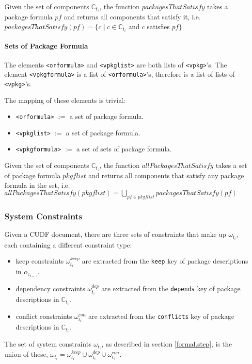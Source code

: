 \begin{defs}
Given the set of components $\mathbb{C}_{t_i}$,
the function $packagesThatSatisfy$ takes a package formula $pf$ and returns all components that satisfy it, i.e. $packagesThatSatisfy(pf) = \{c \mid c \in \mathbb{C}_{t_i}$ and $ c$ satisfies $pf\}$
\end{defs}

\paragraph{Sets of Package Formula}
The elements \texttt{<orformula>} and \texttt{<vpkglist>} are both lists of \texttt{<vpkg>}'s.
The element \texttt{<vpkgformula>} is a list of \texttt{<orformula>}'s, therefore is a list of lists of \texttt{<vpkg>}'s.

The mapping of these elements is trivial:
\begin{itemize}
  \item \texttt{<orformula>} $ := $ a set of package formula.
  \item \texttt{<vpkglist>} $ := $ a set of package formula.
  \item \texttt{<vpkgformula>} $ := $ a set of sets of package formula.
\end{itemize}

\begin{defs}
Given the set of components $\mathbb{C}_{t_i}$,
the function $allPackagesThatSatisfy$ takes a set of package formula $pkgflist$ and returns all components that satisfy any package formula in the set,
i.e. $allPackagesThatSatisfy(pkgflist) = \bigcup \limits_{pf \in pkgflist} packagesThatSatisfy(pf)$ 
\end{defs}

\subsubsection{System Constraints}
Given a CUDF document, there are three sets of constraints that make up $\omega_{t_i}$, each containing a different constraint type:
\begin{itemize}
  \item keep constraints $\omega_{t_i}^{keep}$ are extracted from the \verb+keep+ key of package descriptions in $\alpha_{t_{i-1}}$.
  \item dependency constraints $\omega_{t_i}^{dep}$ are extracted from the \verb+depends+ key of package descriptions in $\mathbb{C}_{t_i}$.
  \item conflict constraints $\omega_{t_i}^{con}$ are extracted from the \verb+conflicts+ key of package descriptions in $\mathbb{C}_{t_i}$.
\end{itemize}
The set of system constraints $\omega_{t_i}$, as described in section \ref{formal.step}, is the union of these,
$\omega_{t_i} =  \omega_{t_i}^{keep} \cup \omega_{t_i}^{dep} \cup \omega_{t_i}^{con}$.


